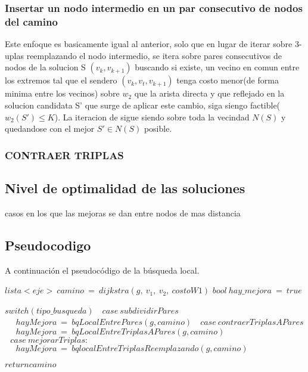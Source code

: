 \subsubsection{Insertar un nodo intermedio en un par consecutivo de nodos del camino}
Este enfoque es basicamente igual al anterior, solo que en lugar de iterar sobre 3-uplas reemplazando el nodo intermedio, se itera sobre pares consecutivos de nodos de la solucion S $(v_k, v_{k+1})$ buscando si existe, un vecino en comun entre los extremos tal que el sendero $(v_k, v_t, v_{k+1})$ tenga costo menor(de forma minima entre los vecinos) sobre $w_2$ que la arista directa y que reflejado en la solucion candidata S' que surge de aplicar este cambio, siga siengo factible($w_2(S') \leq K$). La iteracion de sigue siendo sobre toda la vecindad $N(S)$ y quedandose con el mejor $S' \in N(S)$ posible.


\subsubsection{CONTRAER TRIPLAS}





\subsection{Nivel de optimalidad de las soluciones}

casos en los que las mejoras se dan entre nodos de mas distancia

\subsection{Pseudocodigo}

A continuaci\'on el pseudoc\'odigo de la b\'usqueda local.
\begin{algorithmic}


 \State $lista<eje> \: camino\: =\: dijkstra(g, \:v_1,\: v_2, \:costoW1)$
 \State  $bool\: hay\_mejora\: = \:true$


  \State $switch(tipo\_busqueda)$
	\State$\: \: \: 	case\: subdividirPares$
		\State$\: \: \: \: \: 	\:hayMejora\: = \: bqLocalEntrePares(g,camino)$
	\State$	\: \: \: case\: contraerTriplasAPares$		
		\State$\: \: \: \: \: 	\:hayMejora\: = \: bqLocalEntreTriplasAPares(g,camino)$
	\State$	\: \: \: case \:mejorarTriplas:		$
		\State$\: \: \: \: \: 	\:hayMejora\: = \: bqlocalEntreTriplasReemplazando(g,camino)$

\EndWhile

 \State $return camino$

 \EndProcedure

\end{algorithmic}

